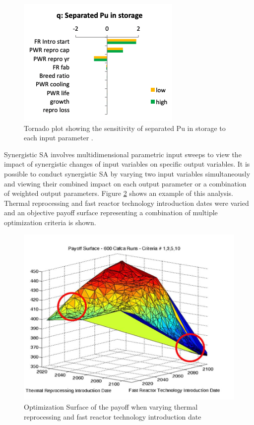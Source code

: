 \begin{figure}[]
	\begin{center}
		\includegraphics[scale=0.65]{./figures/oecd-tornado.png}
	\end{center}	
		\caption{Tornado plot showing the sensitivity of separated Pu in 
		storage to each input parameter \cite{noauthor_effects_2017}.}
	\label{fig:oecd-tornado}
\end{figure}

Synergistic \gls{SA} involves multidimensional parametric 
input sweeps to view the impact of synergistic changes of input 
variables on specific output variables. 
It is possible to conduct synergistic \gls{SA} by varying 
two input variables simultaneously and viewing their 
combined impact on each output parameter or a combination 
of weighted output parameters. 
Figure \ref{fig:passerini_payoff} shows an example of this analysis.
Thermal reprocessing and fast reactor technology introduction dates
were varied and an objective payoff surface representing a combination 
of multiple optimization criteria is shown. 

\begin{figure}[]
	\begin{center}
		\includegraphics[scale=0.25]{./figures/passerini_payoff.jpg}
	\end{center}	
		\caption{Optimization Surface of the payoff when varying thermal 
		reprocessing and fast reactor technology introduction date
		\cite{passerini_systematic_2014}}
	\label{fig:passerini_payoff}
\end{figure} 

